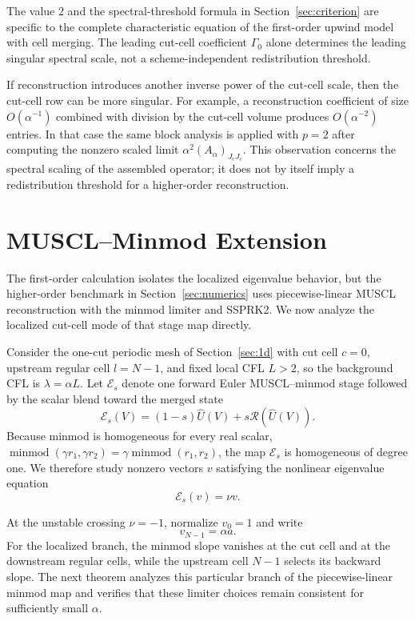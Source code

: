 \documentclass[preprint,12pt]{elsarticle}
\begin{document}
The value $2$ and the spectral-threshold formula in
Section~\ref{sec:criterion} are specific to the complete characteristic
equation of the first-order upwind model with cell merging.  The leading cut-cell coefficient
$\Gamma_0$ alone determines the leading singular spectral scale, not a
scheme-independent redistribution threshold.

If reconstruction introduces another inverse power of the cut-cell scale,
then the cut-cell row can be more singular.  For example, a reconstruction
coefficient of size $O(\alpha^{-1})$ combined with division by the cut-cell
volume produces $O(\alpha^{-2})$ entries.  In that case the same block analysis is
applied with $p=2$ after computing the nonzero scaled limit
$\alpha^2(A_\alpha)_{J_cJ_c}$.  This observation concerns the spectral scaling
of the assembled operator; it does not by itself imply a redistribution threshold
for a higher-order reconstruction.


\section{MUSCL--Minmod Extension}
\label{sec:muscl-theory}

The first-order calculation isolates the localized eigenvalue behavior, but the
higher-order benchmark in Section~\ref{sec:numerics} uses piecewise-linear
MUSCL reconstruction with the minmod limiter and SSPRK2.  We now analyze the
localized cut-cell mode of that stage map directly.

Consider the one-cut periodic mesh of Section~\ref{sec:1d} with cut cell
$c=0$, upstream regular cell $l=N-1$, and fixed local CFL $L>2$, so the
background CFL is $\lambda=\alpha L$.  Let $\mathcal E_s$ denote one
forward Euler MUSCL--minmod stage followed by the scalar blend toward the merged state
\[
    \mathcal E_s(V)
    =(1-s)\widehat U(V)+s\mathcal R(\widehat U(V)).
\]
Because minmod is homogeneous for every real scalar,
$\operatorname{minmod}(\gamma r_1,\gamma r_2)
=\gamma\operatorname{minmod}(r_1,r_2)$, the map $\mathcal E_s$ is
homogeneous of degree one.  We therefore study nonzero vectors $v$ satisfying
the nonlinear eigenvalue equation
\[
    \mathcal E_s(v)=\nu v.
\]

At the unstable crossing $\nu=-1$, normalize $v_0=1$ and write
\[
    v_{N-1}=\alpha a.
\]
For the localized branch, the minmod slope vanishes at the cut cell and at
the downstream regular cells, while the upstream cell $N-1$ selects its
backward slope.  The next theorem analyzes this particular branch of the
piecewise-linear minmod map and verifies that these limiter choices remain
consistent for sufficiently small $\alpha$.
\end{document}
